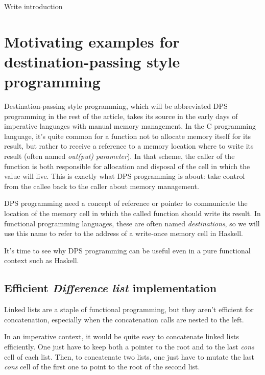 \documentclass[english]{jflart}
\newcommand{\TODO}[1]{{\color{red}\large #1}}
\begin{document}
\TODO{Write introduction}


\section{Motivating examples for destination-passing style programming}\label{sec:motivating-examples}

Destination-passing style programming, which will be abbreviated DPS programming in the rest of the article, takes its source in the early days of imperative languages with manual memory management. In the C programming language, it's quite common for a function not to allocate memory itself for its result, but rather to receive a reference to a memory location where to write its result (often named \emph{out(put) parameter}). In that scheme, the caller of the function is both responsible for allocation and disposal of the cell in which the value will live. This is exactly what DPS programming is about: take control from the callee back to the caller about memory management.

DPS programming need a concept of reference or pointer to communicate the location of the memory cell in which the called function should write its result. In functional programming languages, these are often named \emph{destinations}, so we will use this name to refer to the address of a write-once memory cell in Haskell.

It's time to see why DPS programming can be useful even in a pure functional context such as Haskell.

\subsection{Efficient \emph{Difference list} implementation}

Linked lists are a staple of functional programming, but they aren't efficient for concatenation, especially when the concatenation calls are nested to the left.

In an imperative context, it would be quite easy to concatenate linked lists efficiently. One just have to keep both a pointer to the root and to the last \emph{cons} cell of each list. Then, to concatenate two lists, one just have to mutate the last \emph{cons} cell of the first one to point to the root of the second list.
\end{document}
